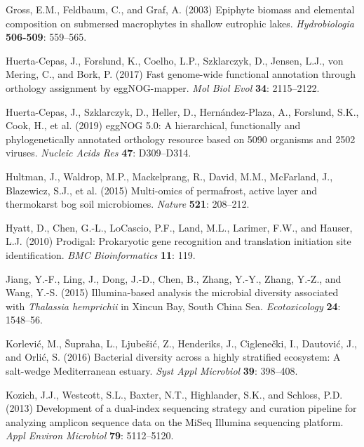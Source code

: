 \documentclass[
  12pt,
]{article}
\begin{document}
\leavevmode\hypertarget{ref-Gross2003}{}%
Gross, E.M., Feldbaum, C., and Graf, A. (2003) Epiphyte biomass and
elemental composition on submersed macrophytes in shallow eutrophic
lakes. \emph{Hydrobiologia} \textbf{506-509}: 559--565.

\leavevmode\hypertarget{ref-Huerta-Cepas2017}{}%
Huerta-Cepas, J., Forslund, K., Coelho, L.P., Szklarczyk, D., Jensen,
L.J., von Mering, C., and Bork, P. (2017) Fast genome-wide functional
annotation through orthology assignment by eggNOG-mapper. \emph{Mol Biol
Evol} \textbf{34}: 2115--2122.

\leavevmode\hypertarget{ref-Huerta-Cepas2019}{}%
Huerta-Cepas, J., Szklarczyk, D., Heller, D., Hernández-Plaza, A.,
Forslund, S.K., Cook, H., et al. (2019) eggNOG 5.0: A hierarchical,
functionally and phylogenetically annotated orthology resource based on
5090 organisms and 2502 viruses. \emph{Nucleic Acids Res} \textbf{47}:
D309--D314.

\leavevmode\hypertarget{ref-Hultman2015}{}%
Hultman, J., Waldrop, M.P., Mackelprang, R., David, M.M., McFarland, J.,
Blazewicz, S.J., et al. (2015) Multi-omics of permafrost, active layer
and thermokarst bog soil microbiomes. \emph{Nature} \textbf{521}:
208--212.

\leavevmode\hypertarget{ref-Hyatt2010}{}%
Hyatt, D., Chen, G.-L., LoCascio, P.F., Land, M.L., Larimer, F.W., and
Hauser, L.J. (2010) Prodigal: Prokaryotic gene recognition and
translation initiation site identification. \emph{BMC Bioinformatics}
\textbf{11}: 119.

\leavevmode\hypertarget{ref-Jiang2015}{}%
Jiang, Y.-F., Ling, J., Dong, J.-D., Chen, B., Zhang, Y.-Y., Zhang,
Y.-Z., and Wang, Y.-S. (2015) Illumina-based analysis the microbial
diversity associated with \emph{Thalassia hemprichii} in Xincun Bay,
South China Sea. \emph{Ecotoxicology} \textbf{24}: 1548--56.

\leavevmode\hypertarget{ref-Korlevic2016}{}%
Korlević, M., Šupraha, L., Ljubešić, Z., Henderiks, J., Ciglenečki, I.,
Dautović, J., and Orlić, S. (2016) Bacterial diversity across a highly
stratified ecosystem: A salt-wedge Mediterranean estuary. \emph{Syst
Appl Microbiol} \textbf{39}: 398--408.

\leavevmode\hypertarget{ref-Kozich2013}{}%
Kozich, J.J., Westcott, S.L., Baxter, N.T., Highlander, S.K., and
Schloss, P.D. (2013) Development of a dual-index sequencing strategy and
curation pipeline for analyzing amplicon sequence data on the MiSeq
Illumina sequencing platform. \emph{Appl Environ Microbiol} \textbf{79}:
5112--5120.
\end{document}
